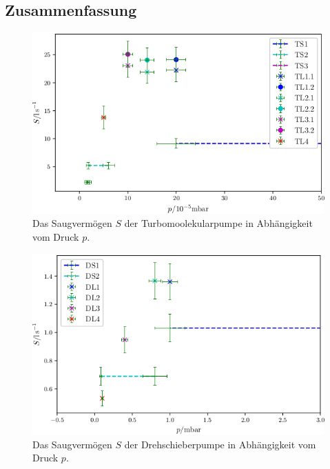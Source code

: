 \subsection{Zusammenfassung}

\begin{figure}
\centering
\includegraphics[width=\linewidth-70pt,height=\textheight-70pt,keepaspectratio]{content/images/TGes.png}
\caption{Das Saugvermögen $S$ der Turbomoolekularpumpe in Abhängigkeit vom Druck $p$.}
\label{fig:TGes}
\end{figure}

\begin{figure}
\centering
\includegraphics[width=\linewidth-70pt,height=\textheight-70pt,keepaspectratio]{content/images/DGes.png}
\caption{Das Saugvermögen $S$ der Drehschieberpumpe in Abhängigkeit vom Druck $p$.}
\label{fig:DGes}
\end{figure}